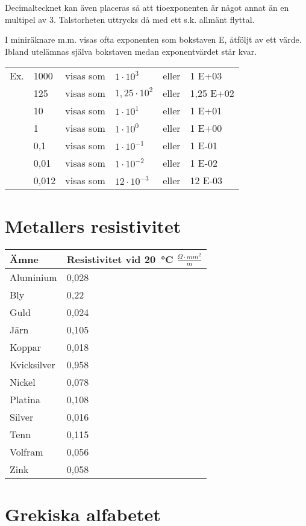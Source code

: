Decimaltecknet kan även placeras så att tioexponenten är något annat
än en multipel av 3. Talstorheten uttrycks då med ett s.k. allmänt
flyttal.

I miniräknare m.m. visas ofta exponenten som bokstaven E, åtföljt av
ett värde. Ibland utelämnas själva bokstaven medan exponentvärdet står
kvar.

\begin{tabular}{llllll}
  Ex. & 1000  & visas som & \(1    \cdot 10^3  \) & eller & 1 E+03 \\
      & 125   & visas som & \(1,25 \cdot 10^2  \) & eller & 1,25 E+02 \\
      & 10    & visas som & \(1    \cdot 10^1  \) & eller & 1 E+01 \\
      & 1     & visas som & \(1    \cdot 10^0  \) & eller & 1 E+00 \\
      & 0,1   & visas som & \(1    \cdot 10^{-1}\) & eller & 1 E-01 \\
      & 0,01  & visas som & \(1    \cdot 10^{-2}\) & eller & 1 E-02 \\
      & 0,012 & visas som & \(12   \cdot 10^{-3}\) & eller & 12 E-03 \\
\end{tabular}

\section{Metallers resistivitet}

\begin{tabular}{l|l}
  Ämne & Resistivitet vid 20~°C \(\frac{Ω\cdot mm^2}{m}\) \\
  \hline
  Aluminium   & 0,028 \\
  Bly         & 0,22  \\
  Guld        & 0,024 \\
  Järn        & 0,105 \\
  Koppar      & 0,018 \\
  Kvicksilver & 0,958 \\
  Nickel      & 0,078 \\
  Platina     & 0,108 \\
  Silver      & 0,016 \\
  Tenn        & 0,115 \\
  Volfram     & 0,056 \\
  Zink        & 0,058 \\
\end{tabular}


\section{Grekiska alfabetet}

